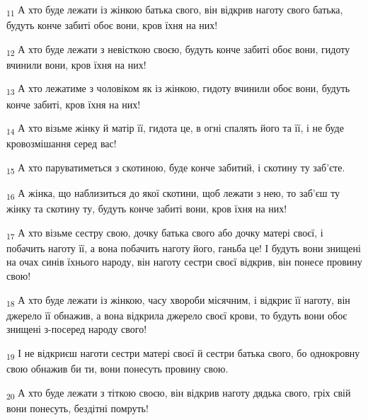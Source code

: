 \begin{tcolorbox}
\textsubscript{11} А хто буде лежати із жінкою батька свого, він відкрив наготу свого батька, будуть конче забиті обоє вони, кров їхня на них!
\end{tcolorbox}
\begin{tcolorbox}
\textsubscript{12} А хто буде лежати з невісткою своєю, будуть конче забиті обоє вони, гидоту вчинили вони, кров їхня на них!
\end{tcolorbox}
\begin{tcolorbox}
\textsubscript{13} А хто лежатиме з чоловіком як із жінкою, гидоту вчинили обоє вони, будуть конче забиті, кров їхня на них!
\end{tcolorbox}
\begin{tcolorbox}
\textsubscript{14} А хто візьме жінку й матір її, гидота це, в огні спалять його та її, і не буде кровозмішання серед вас!
\end{tcolorbox}
\begin{tcolorbox}
\textsubscript{15} А хто паруватиметься з скотиною, буде конче забитий, і скотину ту заб'єте.
\end{tcolorbox}
\begin{tcolorbox}
\textsubscript{16} А жінка, що наблизиться до якої скотини, щоб лежати з нею, то заб'єш ту жінку та скотину ту, будуть конче забиті вони, кров їхня на них!
\end{tcolorbox}
\begin{tcolorbox}
\textsubscript{17} А хто візьме сестру свою, дочку батька свого або дочку матері своєї, і побачить наготу її, а вона побачить наготу його, ганьба це! І будуть вони знищені на очах синів їхнього народу, він наготу сестри своєї відкрив, він понесе провину свою!
\end{tcolorbox}
\begin{tcolorbox}
\textsubscript{18} А хто буде лежати із жінкою, часу хвороби місячним, і відкриє її наготу, він джерело її обнажив, а вона відкрила джерело своєї крови, то будуть вони обоє знищені з-посеред народу свого!
\end{tcolorbox}
\begin{tcolorbox}
\textsubscript{19} І не відкриєш наготи сестри матері своєї й сестри батька свого, бо однокровну свою обнажив би ти, вони понесуть провину свою.
\end{tcolorbox}
\begin{tcolorbox}
\textsubscript{20} А хто буде лежати з тіткою своєю, він відкрив наготу дядька свого, гріх свій вони понесуть, бездітні помруть!
\end{tcolorbox}
